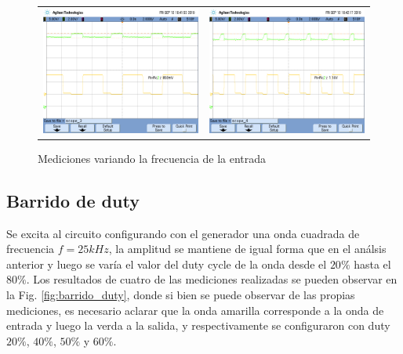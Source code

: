 \begin{figure}[H]
\begin{tabular}{c c}
        \includegraphics[scale=0.2]{../Mediciones/Osciloscopio/Barrido_Frecuencia/scope_3.png} & 
        \includegraphics[scale=0.2]{../Mediciones/Osciloscopio/Barrido_Frecuencia/scope_4.png} 
    \end{tabular}
    \caption{Mediciones variando la frecuencia de la entrada}
    \label{fig:barrido_frecuencia}
\end{figure}

\subsection{Barrido de duty}
Se excita al circuito configurando con el generador una onda cuadrada de frecuencia $f = 25kHz$, la amplitud se mantiene de igual forma que en el an\'alsis anterior y luego
se var\'ia el valor del duty cycle de la onda desde el $20\%$ hasta el $80\%$. Los resultados de cuatro de las mediciones realizadas se pueden observar en la Fig.
\ref{fig:barrido_duty}, donde si bien se puede observar de las propias mediciones, es necesario aclarar que la onda amarilla corresponde a la onda de entrada y luego la verda a la salida,
y respectivamente se configuraron con duty $20\%$, $40\%$, $50\%$ y $60\%$.

